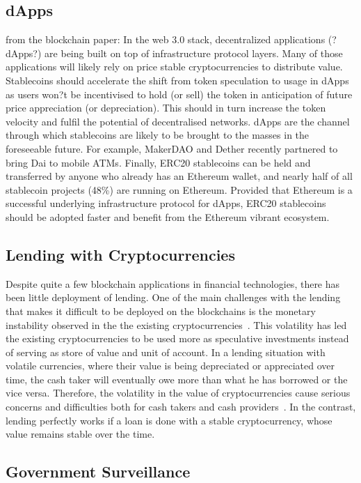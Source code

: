 \subsection{dApps}
from the blockchain paper:
In the web 3.0 stack, decentralized applications (?dApps?) are being built on top of infrastructure protocol
layers. Many of those applications will likely rely on price stable cryptocurrencies to distribute value.
Stablecoins should accelerate the shift from token speculation to usage in dApps as users won?t be
incentivised to hold (or sell) the token in anticipation of future price appreciation (or depreciation). This
should in turn increase the token velocity and fulfil the potential of decentralised networks.
dApps are the channel through which stablecoins are likely to be brought to the masses in the foreseeable
future. For example, MakerDAO and Dether recently partnered to bring Dai to mobile ATMs.
Finally, ERC20 stablecoins can be held and transferred by anyone who already has an Ethereum wallet, and nearly half of all stablecoin projects (48\%) are running on Ethereum. Provided that Ethereum is a successful underlying infrastructure protocol for dApps, ERC20 stablecoins should be adopted faster and benefit from the Ethereum vibrant ecosystem.

\subsection{Lending with Cryptocurrencies}
Despite quite a few blockchain applications in financial technologies, there has been little deployment of lending. One of the main challenges with the lending that makes it difficult to be deployed on the blockchains is the monetary instability observed in the the existing cryptocurrencies~\cite{okoyetoward}. This volatility has led the existing cryptocurrencies to be used more as speculative investments instead of serving as store of value and unit of account. In a lending situation with volatile currencies, where their value is being depreciated or appreciated over time, the cash taker will eventually owe more than what he has borrowed or the vice versa. Therefore, the volatility in the value of cryptocurrencies cause serious concerns and difficulties both for cash takers and cash providers~\cite{okoyetoward}. In the contrast, lending perfectly works if a loan is done with a stable cryptocurrency, whose value remains stable over the time.

\subsection{Government Surveillance}

